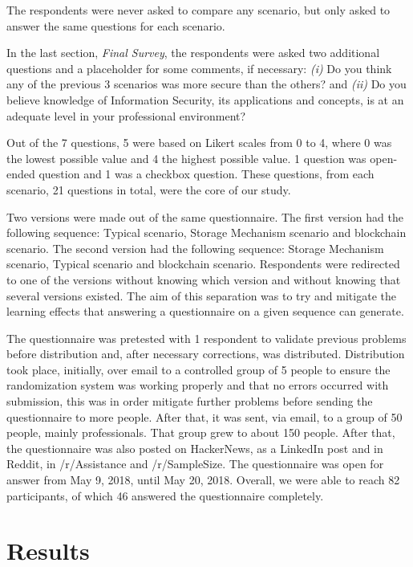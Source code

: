 The respondents were never asked to compare any scenario, but only asked to answer the same questions for each scenario.

In the last section, \textit{Final Survey}, the respondents were asked two additional questions and a placeholder for some comments, if necessary: \emph{(i)} Do you think any of the previous 3 scenarios was more secure than the others? and \emph{(ii)} Do you believe knowledge of Information Security, its applications and concepts, is at an adequate level in your professional environment?


Out of the 7 questions, 5 were based on Likert scales from 0 to 4, where 0 was the lowest possible value and 4 the highest possible value. 1 question was open-ended question and 1 was a checkbox question. These questions, from each scenario, 21 questions in total, were the core of our study.

Two versions were made out of the same questionnaire. The first version had the following sequence: Typical scenario, Storage Mechanism scenario and blockchain scenario. The second version had the following sequence: Storage Mechanism scenario, Typical scenario and blockchain scenario. Respondents were redirected to one of the versions without knowing which version and without knowing that several versions existed. The aim of this separation was to try and mitigate the learning effects that answering a questionnaire on a given sequence can generate.

The questionnaire was pretested with 1 respondent to validate previous problems before distribution and, after necessary corrections, was distributed. Distribution took place, initially, over email to a controlled group of 5 people to ensure the randomization system was working properly and that no errors occurred with submission, this was in order mitigate further problems before sending the questionnaire to more people. After that, it was sent, via email, to a group of 50 people, mainly professionals. That group grew to about 150 people. After that, the questionnaire was also posted on HackerNews, as a LinkedIn post and in Reddit, in /r/Assistance and /r/SampleSize. The questionnaire was open for answer from May 9, 2018, until May 20, 2018. Overall, we were able to reach 82 participants, of which 46 answered the questionnaire completely.

\section{Results}

